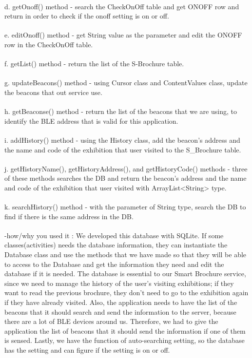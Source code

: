 \documentclass[conference]{IEEEtran}
\begin{document}
\\ d. getOnoff() method - search the CheckOnOff table and get ONOFF row and return in order to check if the onoff setting is on or off.\\
\\ e. editOnoff() method - get String value as the parameter and edit the ONOFF row in the CheckOnOff table. \\
\\ f. getList() method - return the list of the S-Brochure table.\\
\\ g. updateBeacons() method - using Cursor class and ContentValues class, update the beacons that out service use.\\
\\ h. getBeaconse() method - return the list of the beacons that we are using, to identify the BLE address that is valid for this application.\\
\\ i. addHistory() method - using the History class, add the beacon’s address and the name and code of the exhibition that user visited to the S\_Brochure table.\\
\\ j. getHistoryName(), getHistoryAddress(), and getHistoryCode() methods - three of these methods searches the DB and return the beacon’s address and the name and code of the exhibition that user visited with ArrayList<String> type.\\
\\ k. searchHistory() method - with the parameter of String type, search the DB to find if there is the same address in the DB.\\
\\ -how/why you used it : We developed this database with SQLite. If some classes(activities) needs the database information, they can instantiate the Database class and use the methods that we have made so that they will be able to access to the Database and get the information they need and edit the database if it is needed. The database is essential to our Smart Brochure service, since we need to manage the history of the user’s visiting exhibitions; if they want to read the previous brochure, they don’t need to go to the exhibition again if they have already visited. Also, the application needs to have the list of the beacons that it should search and send the information to the server, because there are a lot of BLE devices around us. Therefore, we had to give the application the list of beacons that it should send the information if one of them is sensed. Lastly, we have the function of auto-searching setting, so the database has the setting and can figure if the setting is on or off.\\\\
\end{document}
